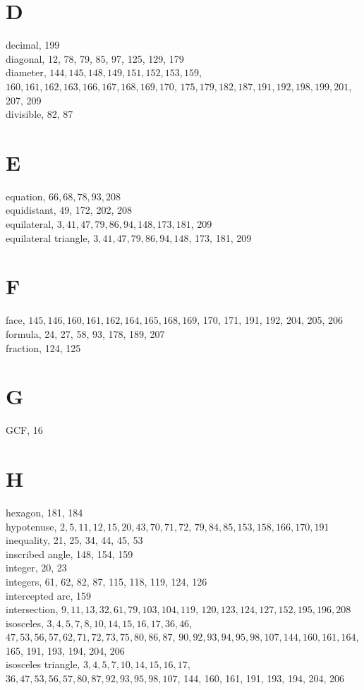 \documentclass[10pt]{article}
\begin{document}
\section*{D}
decimal, 199\\
diagonal, 12, 78, 79, 85, 97, 125, 129, 179\\
diameter, \(144,145,148,149,151,152,153,159\), \(160,161,162,163,166,167,168,169,170\), \(175,179,182,187,191,192,198,199,201\), 207, 209\\
divisible, 82, 87

\section*{E}
equation, \(66,68,78,93,208\)\\
equidistant, 49, 172, 202, 208\\
equilateral, \(3,41,47,79,86,94,148,173,181\), 209\\
equilateral triangle, \(3,41,47,79,86,94,148\), 173, 181, 209

\section*{F}
face, \(145,146,160,161,162,164,165,168,169\), 170, 171, 191, 192, 204, 205, 206\\
formula, 24, 27, 58, 93, 178, 189, 207\\
fraction, 124, 125

\section*{G}
GCF, 16

\section*{H}
hexagon, 181, 184\\
hypotenuse, \(2,5,11,12,15,20,43,70,71,72\), \(79,84,85,153,158,166,170,191\)\\
inequality, 21, 25, 34, 44, 45, 53\\
inscribed angle, 148, 154, 159\\
integer, 20, 23\\
integers, 61, 62, 82, 87, 115, 118, 119, 124, 126\\
intercepted arc, 159\\
intersection, \(9,11,13,32,61,79,103,104,119\), \(120,123,124,127,152,195,196,208\)\\
isosceles, \(3,4,5,7,8,10,14,15,16,17,36,46\), \(47,53,56,57,62,71,72,73,75,80,86,87\), \(90,92,93,94,95,98,107,144,160,161,164\), 165, 191, 193, 194, 204, 206\\
isosceles triangle, \(3,4,5,7,10,14,15,16,17\), \(36,47,53,56,57,80,87,92,93,95,98,107\), 144, 160, 161, 191, 193, 194, 204, 206
\end{document}
